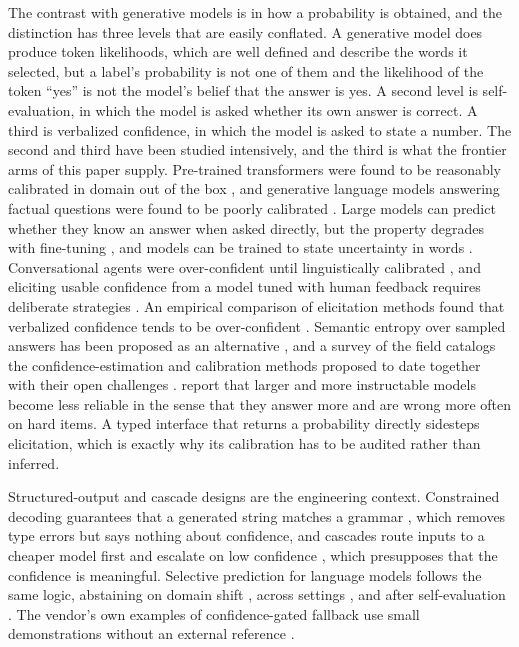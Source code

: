 The contrast with generative models is in how a probability is obtained, and the distinction
has three levels that are easily conflated. A generative model does produce token likelihoods,
which are well defined and describe the words it selected, but a label's probability is not
one of them and the likelihood of the token ``yes'' is not the model's belief that the answer
is yes. A second level is self-evaluation, in which the model is asked whether its own answer
is correct. A third is verbalized confidence, in which the model is asked to state a number.
The second and third have been studied intensively, and the third is what the frontier arms of
this paper supply. Pre-trained transformers were found to be reasonably calibrated in domain out of the box \citep{desai2020calibration}, and generative language models answering factual questions were found to be poorly calibrated \citep{jiang2021calibration}. Large
models can predict whether they know an answer when asked directly, but the property
degrades with fine-tuning \citep{kadavath2022know}, and models can be trained to state
uncertainty in words \citep{lin2022words}. Conversational agents were over-confident until
linguistically calibrated \citep{mielke2022reducing}, and eliciting usable confidence from a
model tuned with human feedback requires deliberate strategies \citep{tian2023just}. An empirical comparison of elicitation methods found that verbalized confidence tends to be over-confident \citep{xiong2024express}. Semantic entropy over sampled answers has been proposed as an alternative \citep{kuhn2023semantic}, and a survey of the field catalogs the confidence-estimation and calibration methods proposed to date together with their open challenges \citep{geng2024survey}. \citet{zhou2024reliable}
report that larger and more instructable models become less reliable in the sense that
they answer more and are wrong more often on hard items. A typed interface that returns a
probability directly sidesteps elicitation, which is exactly why its calibration has to be
audited rather than inferred.

Structured-output and cascade designs are the engineering context. Constrained decoding
guarantees that a generated string matches a grammar \citep{willard2023guided}, which
removes type errors but says nothing about confidence, and cascades route inputs to a
cheaper model first and escalate on low confidence \citep{chen2023frugalgpt}, which
presupposes that the confidence is meaningful. Selective prediction for language models
follows the same logic, abstaining on domain shift \citep{kamath2020selective}, across
settings \citep{varshney2022selective}, and after self-evaluation
\citep{chen2023selfeval}. The vendor's own examples of confidence-gated fallback use
small demonstrations without an external reference \citep{typesafe2026systemone}.

